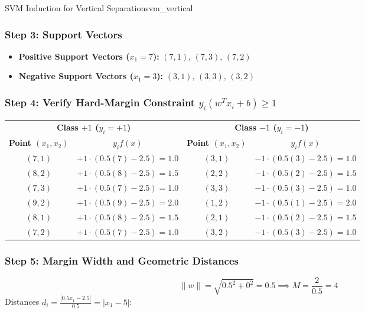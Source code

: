 \begin{example}{SVM Induction for Vertical Separation}{svm_vertical}
\subsubsection{Step 3: Support Vectors}
\begin{itemize}
    \item \textbf{Positive Support Vectors ($x_1 = 7$):} $(7, 1),\, (7, 3),\, (7, 2)$
    \item \textbf{Negative Support Vectors ($x_1 = 3$):} $(3, 1),\, (3, 3),\, (3, 2)$
\end{itemize}

\subsubsection{Step 4: Verify Hard-Margin Constraint \texorpdfstring{$y_i(w^T x_i + b) \ge 1$}{yi(w^T xi + b) >= 1}}

\begin{center}\small
\begin{tabular}{cc|cc}
\toprule
\multicolumn{2}{c|}{\textbf{Class $+1$ ($y_i = +1$)}} & \multicolumn{2}{c}{\textbf{Class $-1$ ($y_i = -1$)}} \\
\textbf{Point $(x_1, x_2)$} & $y_i f(x)$ & \textbf{Point $(x_1, x_2)$} & $y_i f(x)$ \\
\midrule
$(7, 1)$ & $+1 \cdot (0.5(7) - 2.5) = 1.0$ & $(3, 1)$ & $-1 \cdot (0.5(3) - 2.5) = 1.0$ \\
$(8, 2)$ & $+1 \cdot (0.5(8) - 2.5) = 1.5$ & $(2, 2)$ & $-1 \cdot (0.5(2) - 2.5) = 1.5$ \\
$(7, 3)$ & $+1 \cdot (0.5(7) - 2.5) = 1.0$ & $(3, 3)$ & $-1 \cdot (0.5(3) - 2.5) = 1.0$ \\
$(9, 2)$ & $+1 \cdot (0.5(9) - 2.5) = 2.0$ & $(1, 2)$ & $-1 \cdot (0.5(1) - 2.5) = 2.0$ \\
$(8, 1)$ & $+1 \cdot (0.5(8) - 2.5) = 1.5$ & $(2, 1)$ & $-1 \cdot (0.5(2) - 2.5) = 1.5$ \\
$(7, 2)$ & $+1 \cdot (0.5(7) - 2.5) = 1.0$ & $(3, 2)$ & $-1 \cdot (0.5(3) - 2.5) = 1.0$ \\
\bottomrule
\end{tabular}
\end{center}

\subsubsection{Step 5: Margin Width and Geometric Distances}
\begin{equation}
\|w\| = \sqrt{0.5^2 + 0^2} = 0.5 \implies M = \frac{2}{0.5} = 4
\end{equation}
Distances $d_i = \frac{|0.5 x_1 - 2.5|}{0.5} = |x_1 - 5|$:


\end{example}
